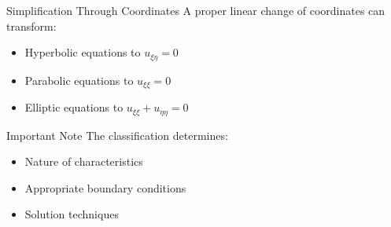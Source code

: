 \documentclass{beamer}
\begin{document}
\begin{frame}{Simplification Through Coordinates}
    A proper linear change of coordinates can transform:
    \begin{itemize}
        \item Hyperbolic equations to $u_{\xi\eta} = 0$
        \item Parabolic equations to $u_{\xi\xi} = 0$
        \item Elliptic equations to $u_{\xi\xi} + u_{\eta\eta} = 0$
    \end{itemize}
    
    \begin{alertblock}{Important Note}
        The classification determines:
        \begin{itemize}
            \item Nature of characteristics
            \item Appropriate boundary conditions
            \item Solution techniques
        \end{itemize}
    \end{alertblock}
\end{frame}
\end{document}
